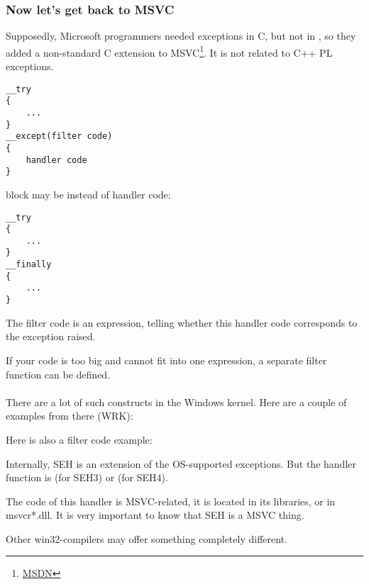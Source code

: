 \subsubsection{Now let's get back to MSVC}


Supposedly, Microsoft programmers needed exceptions in C, but not in \Cpp, so they added a non-standard C extension
to MSVC\footnote{\href{http://go.yurichev.com/17057}{MSDN}}.
It is not related to C++ \ac{PL} exceptions.

\begin{lstlisting}[style=customc]
__try
{
    ...
}
__except(filter code)
{
    handler code
}
\end{lstlisting}

 block may be instead of handler code:

\begin{lstlisting}[style=customc]
__try
{
    ...
}
__finally
{
    ...
}
\end{lstlisting}


The filter code is an expression, telling whether this handler code corresponds to the exception raised.

If your code is too big and cannot fit into one expression, a separate filter function can be defined.\\
\\
There are a lot of such constructs in the Windows kernel.
Here are a couple of examples from there (\ac{WRK}):





Here is also a filter code example:



Internally, SEH is an extension of the OS-supported exceptions.
But the handler function is  (for SEH3) or  (for SEH4).

The code of this handler is MSVC-related, it is located in its libraries, or in msvcr*.dll.
It is very important to know that SEH is a MSVC thing.

Other win32-compilers may offer something completely different.

